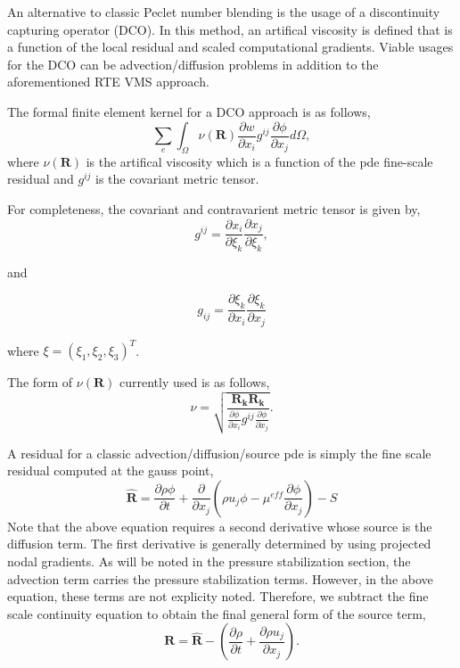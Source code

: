 An alternative to classic Peclet number blending is the usage of a discontinuity capturing operator (DCO).
In this method, an artifical viscosity is defined that is a function of the local residual and scaled computational 
gradients. Viable usages for the DCO can be advection/diffusion problems in addition to the aforementioned RTE
VMS approach.

The formal finite element kernel for a DCO approach is as follows,
\begin{equation}
  \sum_e \int_\Omega \nu(\mathbf{R}) \frac{\partial w}{\partial x_i} g^{ij} \frac{\partial \phi} {\partial x_j} d\Omega,
\label{dcoFEMForm}
\end{equation}
where $\nu(\mathbf{R})$ is the artifical viscosity which is a function of the pde fine-scale residual and $g^{ij}$ is the covariant
metric tensor.

For completeness, the covariant and contravarient metric tensor is given by,
\begin{equation}
  g^{ij} = \frac{\partial x_i} {\partial \xi_k}\frac{\partial x_j} {\partial \xi_k},
\label{coVariant}
\end{equation}

 and

\begin{equation}
  g_{ij} = \frac{\partial \xi_k} {\partial x_i} \frac{\partial \xi_k} {\partial x_j}
\label{coVariant}
\end{equation}

where $\xi = (\xi_1, \xi_2, \xi_3)^T$.

The form of $\nu(\mathbf{R})$ currently used is as follows,
\begin{equation}
  \nu = \sqrt{ \frac{\mathbf{R_k} \mathbf{R_k}} {\frac {\partial \phi}{\partial x_i} g^{ij} \frac{\partial \phi}{\partial x_j}} }.
\label{nuOne}
\end{equation}

A residual for a classic advection/diffusion/source pde is simply the fine scale residual computed at the gauss point,
\begin{equation}
 \mathbf{\hat R} = \frac{\partial \rho \phi}{\partial t} + \frac{\partial}{\partial x_j} (\rho u_j \phi - \mu^{eff} \frac{\partial \phi}{\partial x_j}) -S
 \label{dcoResidual}
\end{equation}
Note that the above equation requires a second derivative whose source is the diffusion term. The first derivative is generally determined
by using projected nodal gradients. As will be noted in the pressure stabilization section, the advection term carries the pressure
stabilization terms. However, in the above equation, these terms are not explicity noted. Therefore, we subtract the fine scale continuity
equation to obtain the final general form of the source term,
\begin{equation}
 \mathbf{R} = \mathbf{\hat R} -  (\frac{\partial \rho}{\partial t} + \frac{\partial \rho u_j }{\partial x_j}).
 \label{dcoResidual}
\end{equation}

